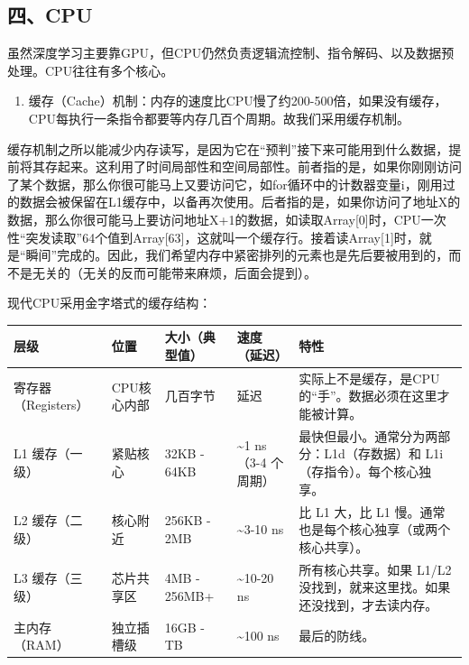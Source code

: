 \hypertarget{ux56dbcpu}{%
\subsection{四、CPU}\label{ux56dbcpu}}

虽然深度学习主要靠GPU，但CPU仍然负责逻辑流控制、指令解码、以及数据预处理。CPU往往有多个核心。

\begin{enumerate}
\def\labelenumi{\arabic{enumi}.}
\tightlist
\item
  缓存（Cache）机制：内存的速度比CPU慢了约200-500倍，如果没有缓存，CPU每执行一条指令都要等内存几百个周期。故我们采用缓存机制。
\end{enumerate}

缓存机制之所以能减少内存读写，是因为它在``预判''接下来可能用到什么数据，提前将其存起来。这利用了时间局部性和空间局部性。前者指的是，如果你刚刚访问了某个数据，那么你很可能马上又要访问它，如for循环中的计数器变量i，刚用过的数据会被保留在L1缓存中，以备再次使用。后者指的是，如果你访问了地址X的数据，那么你很可能马上要访问地址X+1的数据，如读取Array{[}0{]}时，CPU一次性``突发读取''64个值到Array{[}63{]}，这就叫一个缓存行。接着读Array{[}1{]}时，就是``瞬间''完成的。因此，我们希望内存中紧密排列的元素也是先后要被用到的，而不是无关的（无关的反而可能带来麻烦，后面会提到）。

现代CPU采用金字塔式的缓存结构：

\begin{longtable}[]{@{}
  >{\raggedright\arraybackslash}p{}
  >{\raggedright\arraybackslash}p{}
  >{\raggedright\arraybackslash}p{}
  >{\raggedright\arraybackslash}p{}
  >{\raggedright\arraybackslash}p{}@{}}
\toprule
层级 & 位置 & 大小（典型值） & 速度（延迟） & 特性 \\
\midrule
\endhead
寄存器（Registers） & CPU核心内部 & 几百字节 & 0 延迟 & 实际上不是缓存，是CPU的``手''。数据必须在这里才能被计算。 \\
L1 缓存（一级） & 紧贴核心 & 32KB - 64KB & \textasciitilde1 ns（3-4 个周期） & 最快但最小。通常分为两部分：L1d（存数据）和 L1i（存指令）。每个核心独享。 \\
L2 缓存（二级） & 核心附近 & 256KB - 2MB & \textasciitilde3-10 ns & 比 L1 大，比 L1 慢。通常也是每个核心独享（或两个核心共享）。 \\
L3 缓存（三级） & 芯片共享区 & 4MB - 256MB+ & \textasciitilde10-20 ns & 所有核心共享。如果 L1/L2 没找到，就来这里找。如果还没找到，才去读内存。 \\
主内存（RAM） & 独立插槽级 & 16GB - TB & \textasciitilde100 ns & 最后的防线。 \\
\bottomrule
\end{longtable}

